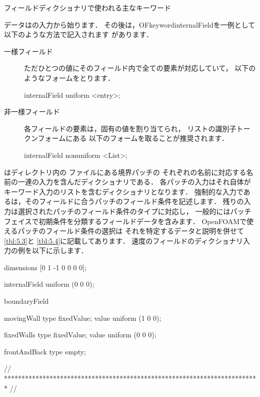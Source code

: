 \begin{table}[ht]
 
 \caption{フィールドディクショナリで使われる主なキーワード}
 \label{tbl:4.3}
\end{table}


データはの入力から始ります．
その後は，OFkeyword{internalField}を一例として以下のような方法で記入されます
があります．
\begin{description}
 \item[一様フィールド]
            ただひとつの値にそのフィールド内で全ての要素が対応していて，
            以下のようなフォームをとります．
\begin{OFverbatim}[file]
internalField uniform <entry>;
\end{OFverbatim}
 \item[非一様フィールド]
            各フィールドの要素は，固有の値を割り当てられ，
            リストの識別子トークンフォームにある
            以下のフォームを取ることが推奨されます．
\begin{OFverbatim}[file]
internalField nonuniform <List>;
\end{OFverbatim}
\end{description}
はディレクトリ内の
ファイルにある境界パッチの
それぞれの名前に対応する名前の一連の入力を含んだディクショナリである．
各パッチの入力はそれ自体がキーワード入力のリストを含むディクショナリとなります．
強制的な入力であるは，そのフィールドに合うパッチのフィールド条件を記述します．
残りの入力は選択されたパッチのフィールド条件のタイプに対応し，
一般的にはパッチフェイスで初期条件を分類するフィールドデータを含みます．
OpenFOAMで使えるパッチのフィールド条件の選択は
それを特定するデータと説明を併せて\autoref{tbl:5.3}と
\autoref{tbl:5.4}に記載してあります．
速度のフィールドのディクショナリ入力の例を以下に示します．
\begin{OFverbatim}[file, linenum=17]
dimensions      [0 1 -1 0 0 0 0];

internalField   uniform (0 0 0);

boundaryField
{
    movingWall
    {
        type            fixedValue;
        value           uniform (1 0 0);
    }

    fixedWalls
    {
        type            fixedValue;
        value           uniform (0 0 0);
    }

    frontAndBack
    {
        type            empty;
    }
}

// ************************************************************************* //
\end{OFverbatim}


